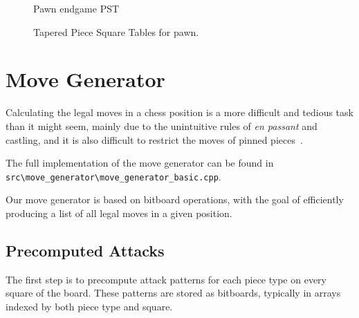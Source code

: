 \begin{figure}[H]
\begin{minipage}{0.4\textwidth}
        \caption*{Pawn endgame PST}
    \end{minipage}
    \caption{Tapered Piece Square Tables for pawn.}
    \label{fig:taperedPSTpawns}
\end{figure}

\section{Move Generator}

Calculating the legal moves in a chess position is a more difficult and tedious task
than it might seem, mainly due to the unintuitive rules of \textit{en passant} and castling,
and it is also difficult to restrict the moves of pinned pieces~\cite{GenerateLegalMovesEfficiently}.

\vspace{1em}

\noindent \parbox{\textwidth}{The full implementation of the move generator can be found in \texttt{src\textbackslash{}move\_generator\textbackslash{}move\_generator\_basic.cpp}.}

\vspace{1em}

\noindent Our move generator is based on bitboard operations, with the goal of efficiently producing a list of all legal moves in a given position.

\subsection{Precomputed Attacks}

\noindent The first step is to precompute attack patterns for each piece type on every square of the board. These patterns are stored as bitboards, typically in arrays indexed by both piece type and square.

\vspace{1em}


